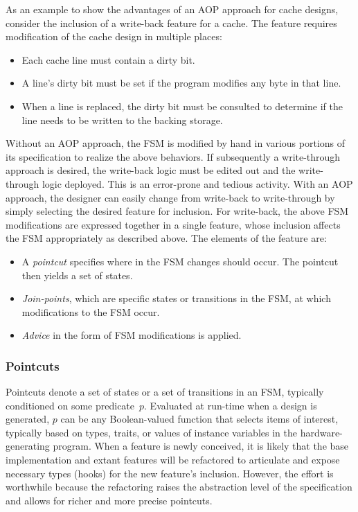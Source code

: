 \documentclass[conference]{IEEEtran}
\begin{document}
As an example to show the advantages of an AOP approach for cache designs, consider the inclusion of a write-back feature for a cache. The feature requires modification of the cache design in multiple places:
\begin{itemize}
    \item Each cache line must contain a dirty bit.
    \item A line's dirty bit must be set if the program modifies any byte in that line.
    \item When a line is replaced, the dirty bit must be consulted to determine if the line needs to be written to the backing storage.
\end{itemize}
Without an AOP approach, the FSM is modified by hand in various portions of its specification to realize the above behaviors.   If subsequently a write-through approach is desired, the write-back logic must be edited out and the write-through logic deployed.  This is an error-prone and tedious activity.
With an AOP approach, the designer can easily change from write-back to write-through by simply selecting the desired feature for inclusion.  For write-back, the above FSM modifications are expressed together in a single feature, whose inclusion affects the FSM appropriately as described above.  The elements of the feature are:
\begin{itemize}
    \item A \emph{pointcut} specifies where in the FSM changes should occur.  The pointcut then yields a set of states.
    \item \emph{Join-points}, which are specific states or transitions in the FSM, at which modifications to the FSM occur.
    \item \emph{Advice} in the form of FSM modifications is applied.
\end{itemize}

\subsubsection{Pointcuts}
Pointcuts denote a set of states or a set of transitions in an FSM, typically conditioned on some predicate~$p$.
Evaluated at run-time when a design is generated, $p$ can be any Boolean-valued function that selects items of interest, typically based on types, traits, or values of instance variables in the hardware-generating program.  When a feature is newly conceived, it is likely that the base implementation and extant features will be refactored to articulate and expose necessary types (hooks) for the new feature's inclusion. However, the effort is worthwhile because the refactoring raises the abstraction level of the specification and allows for richer and more precise pointcuts.
\end{document}
